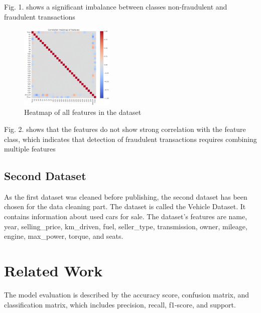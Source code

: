 \documentclass[a4paper,twocolumn,12pt]{article}
\begin{document}
Fig. 1. shows a significant imbalance between classes non-fraudulent and fraudulent transactions

\begin{figure}[h]
\centering
\includegraphics[width = 0.4\textwidth]{Figuras/HeatMap of Fdata.png}
\caption{Heatmap of all features in the dataset}
\end{figure}

Fig. 2. shows that the features do not show strong correlation with the feature class, which indicates that detection of fraudulent transactions requires combining multiple features  

\subsection{Second Dataset}



As the first dataset was cleaned before publishing, the second dataset has been chosen for the data cleaning part. The dataset is called the Vehicle Dataset. It contains information about used cars for sale. The dataset's features are name, year, selling\_price, km\_driven, fuel, seller\_type, transmission, owner, mileage, engine, max\_power, torque, and seats.



\section{Related Work}


    
The model evaluation is described by the accuracy score, confusion matrix, and classification matrix, which includes precision, recall, f1-score, and support. 
\end{document}
